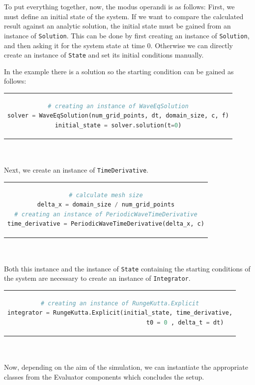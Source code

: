 \\\\
To put everything together, now, the modus operandi is as follows:
First, we must define an initial state of the system.
If we want to compare the calculated result against an analytic solution, the initial state must be gained from an instance of \texttt{Solution}.
This can be done by first creating an instance of \texttt{Solution}, and then asking it for the system state at time $0$.
Otherwise we can directly create an instance of \texttt{State} and set its initial conditions manually.

In the example there is a solution so the starting condition can be gained as follows:\\
\begin{tabular}{c}
\begin{lstlisting}[language=Python]
# creating an instance of WaveEqSolution
solver = WaveEqSolution(num_grid_points, dt, domain_size, c, f)
initial_state = solver.solution(t=0)
\end{lstlisting}
\end{tabular}
\\\\
Next, we create an instance of \texttt{TimeDerivative}.\\
\begin{tabular}{c}
\begin{lstlisting}[language=Python]
# calculate mesh size
delta_x = domain_size / num_grid_points
# creating an instance of PeriodicWaveTimeDerivative
time_derivative = PeriodicWaveTimeDerivative(delta_x, c)
\end{lstlisting}
\end{tabular}\\\\
Both this instance and the instance of \texttt{State} containing the starting conditions of the system are necessary to create an instance of \texttt{Integrator}.\\
\begin{tabular}{c}
\begin{lstlisting}[language=Python]
# creating an instance of RungeKutta.Explicit
integrator = RungeKutta.Explicit(initial_state, time_derivative,
                                     t0 = 0 , delta_t = dt)
\end{lstlisting}
\end{tabular}
\\\\
Now, depending on the aim of the simulation, we can instantiate the appropriate classes from the Evaluator components which concludes the setup.
